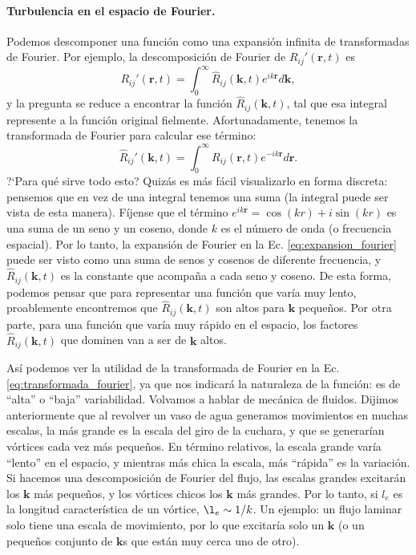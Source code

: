 \paragraph*{Turbulencia en el espacio de Fourier.}
Podemos descomponer una función como una expansión infinita de transformadas de Fourier.
Por ejemplo, la descomposición de Fourier de $R_{ij}'(\mathbf{r},t)$ es
%
\begin{equation}\label{eq:expansion_fourier}
R_{ij}'(\mathbf{r},t) = \int_0^\infty \hat{R}_{ij}(\mathbf{k},t)e^{ik\mathbf{r}}d\mathbf{k},
\end{equation}
%
y la pregunta se reduce a encontrar la función $\hat{R}_{ij}(\mathbf{k},t)$, tal que esa integral represente a la función original fielmente.
Afortunadamente, tenemos la transformada de Fourier para calcular ese término:
%
\begin{equation}\label{eq:transformada_fourier}
\hat{R}_{ij}'(\mathbf{k},t) = \int_0^\infty R_{ij}(\mathbf{r},t)e^{-ik\mathbf{r}}d\mathbf{r}.
\end{equation}
%
\mbox{?`}Para qué sirve todo esto? Quizás es más fácil visualizarlo en forma discreta: pensemos que en vez de una integral tenemos una suma (la integral puede ser vista de esta manera).
Fíjense que el término $e^{ik\mathbf{r}}=\cos(kr)+i\sin(kr)$ es una suma de un seno y un coseno, donde $k$ es el número de onda (o frecuencia espacial).
Por lo tanto, la expansión de Fourier en la Ec. \eqref{eq:expansion_fourier} puede ser visto como una suma de senos y cosenos de diferente frecuencia, y $\hat{R}_{ij}(\mathbf{k},t)$ es la constante que acompaña a cada seno y coseno.
De esta forma, podemos pensar que para representar una función que varía muy lento, proablemente encontremos que $\hat{R}_{ij}(\mathbf{k},t)$ son altos para $\mathbf{k}$ pequeños.
Por otra parte, para una función que varía muy rápido en el espacio, los factores $\hat{R}_{ij}(\mathbf{k},t)$ que dominen van a ser de $\mathbf{k}$ altos.

Así podemos ver la utilidad de la transformada de Fourier en la Ec. \eqref{eq:transformada_fourier}, ya que nos indicará la naturaleza de la función: es de ``alta'' o ``baja'' variabilidad.
Volvamos a hablar de mecánica de fluidos.
Dijimos anteriormente que al revolver un vaso de agua generamos movimientos en muchas escalas, la más grande es la escala del giro de la cuchara, y que se generarían vórtices cada vez más pequeños.
En término relativos, la escala grande varía ``lento'' en el espacio, y mientras más chica la escala, más ``rápida'' es la variación.
Si hacemos una descomposición de Fourier del flujo, las escalas grandes excitarán los $\mathbf{k}$ más pequeños, y los vórtices chicos los $\mathbf{k}$ más grandes.
Por lo tanto, si $l_e$ es la longitud característica de un vórtice, $\l_e\sim 1/k$.
Un ejemplo: un flujo laminar solo tiene una escala de movimiento, por lo que excitaría solo un $\mathbf{k}$ (o un pequeños conjunto de $\mathbf{k}$s que están muy cerca uno de otro).

